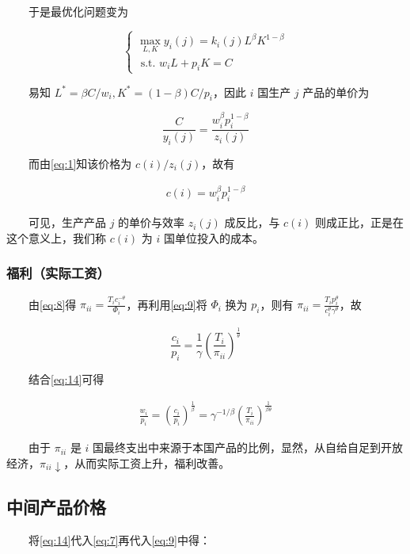 \documentclass[]{article}
\begin{document}
　　于是最优化问题变为

\[
\left\{\begin{array}{c}
{\max_{L, K} y_{i}(j)=k_{i}(j)L^{\beta}K^{1-\beta}} \\ {\text { s.t. } w_{i}L + p_{i}K = C}
\end{array}\right.
\]

　　易知 \(L^*=\beta C/w_i, K^*=(1-\beta)C/p_i\)，因此 \(i\) 国生产 \(j\) 产品的单价为

\[\frac{C}{y_{i}(j)}=\frac{w_{i}^{\beta}p_{i}^{1-\beta}}{z_{i}(j)}\]

　　而由\eqref{eq:1}知该价格为 \(c(i)/{z_{i}(j)}\)，故有

\begin{align}
c(i)=w_{i}^{\beta}p_{i}^{1-\beta} \label{eq:14}
\end{align}

　　可见，生产产品 \(j\) 的单价与效率 \(z_{i}(j)\) 成反比，与 \(c(i)\) 则成正比，正是在这个意义上，我们称 \(c(i)\) 为 \(i\) 国单位投入的成本。

\hypertarget{section-16}{%
\subsubsection{福利（实际工资）}\label{section-16}}

　　由\eqref{eq:8}得 \(\pi_{ii}=\frac{T_{i}c_{i}^{-\theta}}{\Phi_{i}}\)，再利用\eqref{eq:9}将 \(\Phi_{i}\) 换为 \(p_{i}\)，则有 \(\pi_{ii}=\frac{T_{i}p_{i}^{\theta}}{c_{i}^{\theta}\gamma^{\theta}}\)，故

\[\frac{c_i}{p_i}=\frac{1}{\gamma}\left(\frac{T_i}{\pi_{ii}}\right)^{\frac{1}{\theta}}\]

　　结合\eqref{eq:14}可得

\begin{align}
\frac{w_i}{p_i}=\left(\frac{c_i}{p_{i}}\right)^{\frac{1}{\beta}}=\gamma^{-1/\beta}\left(\frac{T_i}{\pi_{ii}}\right)^{\frac{1}{\beta\theta}} \label{eq:15}
\end{align}

　　由于 \(\pi_{ii}\) 是 \(i\) 国最终支出中来源于本国产品的比例，显然，从自给自足到开放经济，\(\pi_{ii} \downarrow\)，从而实际工资上升，福利改善。

\hypertarget{section-17}{%
\subsection{中间产品价格}\label{section-17}}

　　将\eqref{eq:14}代入\eqref{eq:7}再代入\eqref{eq:9}中得：
\end{document}
